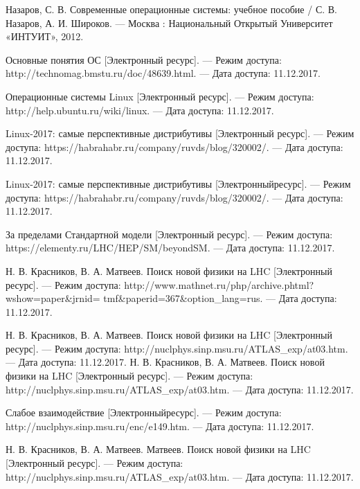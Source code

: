 

	Назаров, С. В. 
	Современные операционные системы: учебное пособие 
	/ С. В. Назаров, А. И. Широков. 
	— Москва : Национальный Открытый Университет «ИНТУИТ», 2012.

	Основные понятия ОС 
	[Электронный ресурс].
	 — Режим досту­па: http://technomag.bmstu.ru/doc/48639.html.
	 — Дата доступа: 11.12.2017.

	Операционные системы Linux 
	[Электронный ресурс].
	 — Ре­жим доступа: http://help.ubuntu.ru/wiki/linux.
	 — Дата доступа: 11.12.2017.
	 
	 Linux-2017: самые перспективные дистрибутивы  
	 [Электронный ресурс].
	 — Ре­жим доступа: https://habrahabr.ru/company/ruvds/blog/320002/.
	 — Дата доступа: 11.12.2017.

	Linux-2017: самые перспективные дистрибутивы 
	[Электронныйресурс].
	 — Режим доступа: https://habrahabr.ru/company/ruvds/blog/320002/.
	 — Дата доступа: 11.12.2017.

	За пределами Стандартной модели
	[Электронный ресурс].
	 — Режим доступа: https://elementy.ru/LHC/HEP/SM/beyondSM. 
	 — Да­та доступа: 11.12.2017.

	Н. В. Красников, В. А. Матвеев. 
	Поиск новой фи­зики на LHC 
	[Электронный ресурс].
	 — Режим доступа:
	http://www.mathnet.ru/php/archive.phtml?wshow=paper\&jrnid=
	tmf\&paperid=367\&option\_lang=rus.
	 — Дата доступа: 11.12.2017.


	Н. В. Красников, В. А. 
	Матвеев. Поиск новой физики на LHC
	[Электронный ресурс].
	 — Режим доступа: http://nuclphys.sinp.msu.ru/ATLAS\_exp/at03.htm. 
	 — Дата доступа: 11.12.2017.
	Н. В. Красников, В. А. 
	Матвеев. Поиск новой физики на LHC
	[Электронный ресурс].
	— Режим доступа: http://nuclphys.sinp.msu.ru/ATLAS\_exp/at03.htm. 
	— Дата доступа: 11.12.2017.
	
	Слабое взаимодействие 
	[Электронныйресурс].
	— Режим доступа: http://nuclphys.sinp.msu.ru/enc/e149.htm.
	— Дата доступа: 11.12.2017.

	 
	Н. В. Красников, В. А. Матвеев. 
	Матвеев. Поиск новой физики на LHC
	[Электронный ресурс].
	— Режим доступа: http://nuclphys.sinp.msu.ru/ATLAS\_exp/at03.htm. 
	— Дата доступа: 11.12.2017.





